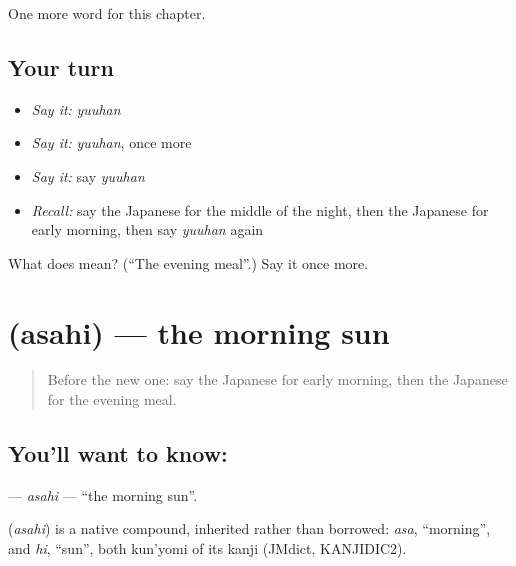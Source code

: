 \begin{grammarlens}[title={What you've built}]
One more word for this chapter.
\end{grammarlens}

\subsection*{Your turn}
\begin{itemize}
\raggedright
  \item \emph{Say it:} \emph{yuuhan}
  \item \emph{Say it:} \emph{yuuhan}, once more
  \item \emph{Say it:} say \emph{yuuhan}
  \item \emph{Recall:} say the Japanese for the middle of the night, then the Japanese for early morning, then say \emph{yuuhan} again
\end{itemize}

\begin{tcolorbox}[breakable,colback=teal!4,colframe=teal!35!black,title={Before you move on}]
What does  mean? (\textquotedblleft{}The evening meal\textquotedblright{}.) Say it once more.
\end{tcolorbox}
\section[\texorpdfstring{\ja{あさひ} (asahi)}{あさひ (asahi)}]{ (asahi) — the morning sun}

\label{lesson:JA-C72-asahi}



\begin{quote}
Before the new one: say the Japanese for early morning, then the Japanese for the evening meal.
\end{quote}

\subsection*{You'll want to know: }
\textbf{} — \emph{asahi} — \textquotedblleft{}the morning sun\textquotedblright{}.

\begin{cousinweb}
\textbf{} (\emph{asahi}) is a native compound, inherited rather than borrowed: \emph{asa}, \textquotedblleft{}morning\textquotedblright{}, and \emph{hi}, \textquotedblleft{}sun\textquotedblright{}, both kun'yomi of its kanji (JMdict, KANJIDIC2).
\end{cousinweb}

